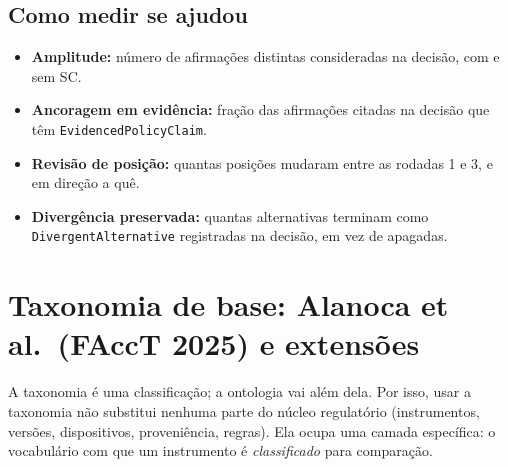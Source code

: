 \documentclass[12pt,a4paper,oneside,english,brazil]{abntex2}
\begin{document}
\section{Como medir se ajudou}\label{sec:medir}
\begin{itemize}[leftmargin=*]
  \item \textbf{Amplitude:} número de afirmações distintas consideradas na decisão, com e sem SC.
  \item \textbf{Ancoragem em evidência:} fração das afirmações citadas na decisão que têm \texttt{Evidenced\allowbreak Policy\allowbreak Claim}.
  \item \textbf{Revisão de posição:} quantas posições mudaram entre as rodadas 1 e 3, e em direção a quê.
  \item \textbf{Divergência preservada:} quantas alternativas terminam como \texttt{DivergentAlternative} registradas na decisão, em vez de apagadas.
\end{itemize}

\chapter{Taxonomia de base: Alanoca et al.\ (FAccT 2025) e extensões}\label{sec:alanoca}


A taxonomia é uma classificação; a ontologia vai além dela. Por isso, usar a taxonomia não substitui nenhuma parte do núcleo regulatório (instrumentos, versões, dispositivos, proveniência, regras). Ela ocupa uma camada específica: o vocabulário com que um instrumento é \emph{classificado} para comparação.
\end{document}
